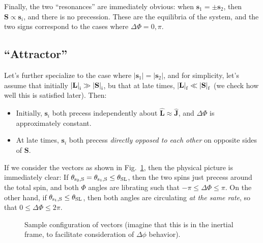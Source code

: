 \documentclass[11pt,
        usenames, %
        dvipsnames %
    ]{article}
\newcommand*{\bm}[1]{\boldsymbol{\mathbf{#1}}}
\newcommand*{\uv}[1]{\hat{\bm{#1}}}
\newcommand*{\abs}[1]{\left|#1\right|}
\begin{document}
Finally, the two ``resonances'' are immediately obvious: when $\bm{s}_1 = \pm
\bm{s}_2$, then $\bm{S} \propto \bm{s}_i$, and there is no precession. These are
the equilibria of the system, and the two signs correspond to the cases where
$\Delta \Phi = 0, \pi$.

\subsection{``Attractor''}

Let's further specialize to the case where $\abs{\bm{s}_1} = \abs{\bm{s}_2}$,
and for simplicity, let's assume that initially $\abs{\bm{L}}_{\rm i} \gg
\abs{\bm{S}}_{\rm i}$, bu that at late times, $\abs{\bm{L}}_{\rm f} \ll
\abs{\bm{S}}_{\rm f}$ (we check how well this is satisfied later). Then:
\begin{itemize}
    \item Initially, $\bm{s}_i$ both precess independently about $\uv{L} \approx
        \uv{J}$, and $\Delta \Phi$ is approximately constant.

    \item At late times, $\bm{s}_i$ both precess \emph{directly opposed to each
        other} on opposite sides of $\bm{S}$.
\end{itemize}
If we consider the vectors as shown in Fig.~\ref{fig:fig}, then the physical
picture is immediately clear: If $\theta_{\rm s_2, S} = \theta_{\rm s_1, S} \leq
\theta_{\rm SL}$, then the two spins just precess around the total spin, and
both $\Phi$ angles are librating such that $-\pi \leq \Delta \Phi \leq \pi$. On
the other hand, if $\theta_{\rm s_1, S} \leq \theta_{\rm SL}$, then both angles
are circulating \emph{at the same rate}, so that $0 \leq \Delta \Phi \leq 2\pi$.
\begin{figure}
    \centering
    \caption{Sample configuration of vectors (imagine that this is in the
    inertial frame, to facilitate consideration of $\Delta \phi$
    behavior).}\label{fig:fig}
\end{figure}
\end{document}

